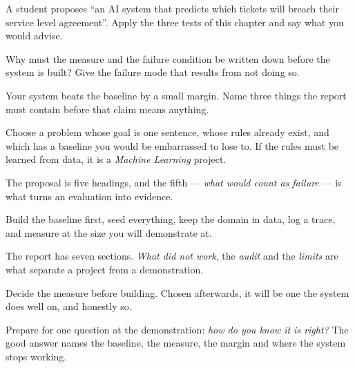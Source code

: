 \begin{checkpoint}
\begin{tightnum}
  \item A student proposes ``an AI system that predicts which tickets will breach
        their service level agreement''. Apply the three tests of this chapter and
        say what you would advise.
  \item Why must the measure and the failure condition be written down before the
        system is built? Give the failure mode that results from not doing so.
  \item Your system beats the baseline by a small margin. Name three things the
        report must contain before that claim means anything.
\end{tightnum}
\end{checkpoint}

\begin{chaptersummary}
\begin{tight}
  \item Choose a problem whose goal is one sentence, whose rules already exist, and
        which has a baseline you would be embarrassed to lose to. If the rules must
        be learned from data, it is a \emph{Machine Learning} project.
  \item The proposal is five headings, and the fifth --- \emph{what would count as
        failure} --- is what turns an evaluation into evidence.
  \item Build the baseline first, seed everything, keep the domain in data, log a
        trace, and measure at the size you will demonstrate at.
  \item The report has seven sections. \emph{What did not work}, the \emph{audit}
        and the \emph{limits} are what separate a project from a demonstration.
  \item Decide the measure before building. Chosen afterwards, it will be one the
        system does well on, and honestly so.
  \item Prepare for one question at the demonstration: \emph{how do you know it is
        right?} The good answer names the baseline, the measure, the margin and
        where the system stops working.
\end{tight}
\end{chaptersummary}

